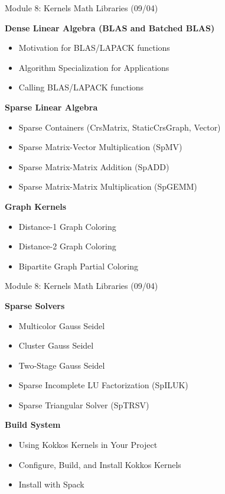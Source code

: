 \begin{frame}[fragile]{Module 8: Kernels Math Libraries (09/04)}

	\vspace{3pt}
	\textbf{Dense Linear Algebra (BLAS and Batched BLAS)}
	\begin{itemize}
        \item Motivation for BLAS/LAPACK functions
        \item Algorithm Specialization for Applications
        \item Calling BLAS/LAPACK functions
	\end{itemize}

	\vspace{3pt}
	\textbf{Sparse Linear Algebra}
	\begin{itemize}
        \item Sparse Containers (CrsMatrix, StaticCrsGraph, Vector)
        \item Sparse Matrix-Vector Multiplication (SpMV)
        \item Sparse Matrix-Matrix Addition (SpADD)
        \item Sparse Matrix-Matrix Multiplication (SpGEMM)
	\end{itemize}

  \vspace{3pt}
  \textbf{Graph Kernels}
  \begin{itemize}
        \item Distance-1 Graph Coloring
        \item Distance-2 Graph Coloring
        \item Bipartite Graph Partial Coloring
  \end{itemize}

\end{frame}

\begin{frame}[fragile]{Module 8: Kernels Math Libraries (09/04)}

	\vspace{3pt}
	\textbf{Sparse Solvers}
	\begin{itemize}
        \item Multicolor Gauss Seidel
        \item Cluster Gauss Seidel
        \item Two-Stage Gauss Seidel
        \item Sparse Incomplete LU Factorization (SpILUK)
        \item Sparse Triangular Solver (SpTRSV)
	\end{itemize}

	\vspace{3pt}
	\textbf{Build System}
	\begin{itemize}
        \item Using Kokkos Kernels in Your Project
        \item Configure, Build, and Install Kokkos Kernels
        \item Install with Spack
	\end{itemize}

\end{frame}


